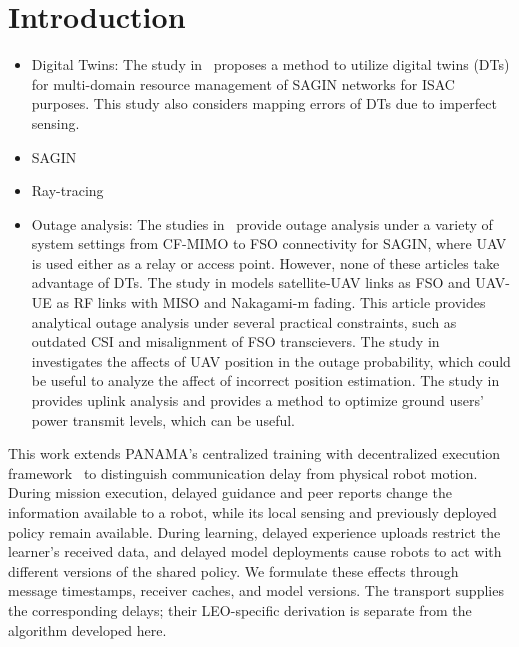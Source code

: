 \section{Introduction}
\begin{itemize}
    \item Digital Twins: The study in~\cite{dt_resource} proposes a method to utilize digital twins (DTs) for multi-domain resource management of SAGIN networks for ISAC purposes. This study also considers mapping errors of DTs due to imperfect sensing.   
    \item SAGIN 
    \item Ray-tracing
    \item Outage analysis: The studies in~\cite{o_altitude,o_cfmimo,o_fso} provide outage analysis under a variety of system settings from CF-MIMO to FSO connectivity for SAGIN, where UAV is used either as a relay or access point. However, none of these articles take advantage of DTs.
    The study in \cite{o_fso} models satellite-UAV links as FSO and UAV-UE as RF links with MISO and Nakagami-m fading. This article provides analytical outage analysis under several practical constraints, such as outdated CSI and misalignment of FSO transcievers. The study in~\cite{o_altitude} investigates the affects of UAV position in the outage probability, which could be useful to analyze the affect of incorrect position estimation. The study in~\cite{o_cfmimo} provides uplink analysis and provides a method to optimize ground users' power transmit levels, which can be useful.
\end{itemize}



\begin{panamaaddition}
This work extends PANAMA's centralized training with decentralized execution
framework~\cite{panama} to distinguish communication delay from physical robot
motion. During mission execution, delayed guidance and peer reports change the
information available to a robot, while its local sensing and previously
deployed policy remain available. During learning, delayed experience uploads
restrict the learner's received data, and delayed model deployments cause
robots to act with different versions of the shared policy. We formulate these
effects through message timestamps, receiver caches, and model versions. The
transport supplies the corresponding delays; their LEO-specific derivation is
separate from the algorithm developed here.
\end{panamaaddition}
